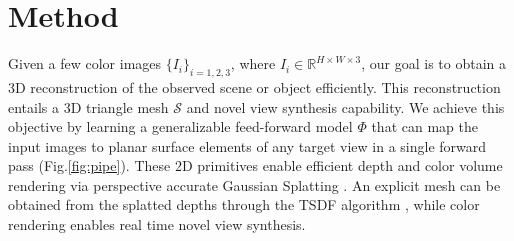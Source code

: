 

\section{Method}
\label{sec:method}

Given a few color images \eg $\{I_i\}_{i=1,2,3}$, where \( I_i \in \mathbb{R}^{H \times W \times 3} \), our goal is to obtain a 3D reconstruction of the observed scene or object efficiently. This reconstruction entails a 3D triangle mesh $\mathcal{S}$ and novel view synthesis capability. We achieve this objective by learning a generalizable feed-forward model \( \Phi \) that can map the input images to planar surface elements of any target view in a single forward pass (Fig.\ref{fig:pipe}). These $2$D primitives enable efficient depth and color volume rendering via perspective accurate Gaussian Splatting \cite{huang20242d}. An explicit mesh can be obtained from the splatted depths through the TSDF algorithm \cite{zhou2018open3d}, while color rendering enables real time novel view synthesis. 




